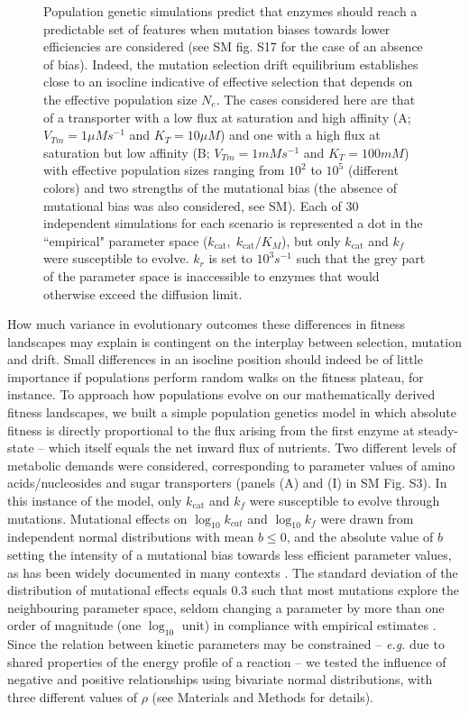 \begin{figure}[h!]
\begin{minipage}[c]{0.46\linewidth}
\end{minipage}
\caption{Population genetic simulations predict that enzymes should reach a predictable set of features when mutation biases towards lower efficiencies are considered (see SM  fig. S17 for the case of an absence of bias). Indeed, the mutation selection drift equilibrium establishes close to an isocline indicative of effective selection that depends on the effective population size $N_e$. The cases considered here are that of a transporter with a low flux at saturation and high affinity (A; $V_{Tm}=1\mu Ms^{-1}$ and $K_T=10\mu M$) and one with a high flux at saturation but low affinity (B; $V_{Tm}=1mMs^{-1}$ and $K_T=100mM$) with effective population sizes ranging from $10^2$ to $10^5$ (different colors) and two strengths of the mutational bias (the absence of mutational bias was also considered, see SM). Each of 30 independent simulations for each scenario is represented a dot in the ``empirical" parameter space ($k_\text{cat}, \;k_\text{cat}/K_M$), but only $k_\text{cat}$ and $k_f$ were susceptible to evolve. $k_r$ is set to $10^3s^{-1}$ such that the grey part of the parameter space is inaccessible to enzymes that would otherwise exceed the diffusion limit. 
}
\label{figure2D_Evolutionary_results}
\end{figure}

How much variance in evolutionary outcomes these differences in fitness landscapes may explain is contingent on the interplay between selection, mutation and drift. Small differences in an isocline position should indeed be of little importance if populations perform random walks on the fitness plateau, for instance. To approach how populations evolve on our mathematically derived fitness landscapes, we built a simple population genetics model in which absolute fitness is directly proportional to the flux arising from the first enzyme at steady-state -- which itself equals the net inward flux of nutrients. Two different levels of metabolic demands were considered, corresponding to parameter values of amino acids/nucleosides and sugar transporters (panels (A) and (I) in SM Fig. S3). In this instance of the model, only $k_\text{cat}$ and $k_f$ were susceptible to evolve through mutations. Mutational effects on $\log_{10}k_{cat}$ and $\log_{10}k_f$ were drawn from independent normal distributions with mean $b \leq 0$, and the absolute value of $b$ setting the intensity of a mutational bias towards less efficient parameter values, as has been widely documented in many contexts \citep{EyreWalker07,Serohijos12,Heckmann18}. The standard deviation of the distribution of mutational effects equals $0.3$ such that most mutations explore the neighbouring parameter space,  seldom changing a parameter by more than one order of magnitude (one $\log_{10}$ unit) in compliance with empirical estimates \citep{Carlin16}. Since the relation between kinetic parameters may be constrained -- \textit{e.g.} due to shared properties of the energy profile of a reaction -- we tested the influence of negative and positive relationships using bivariate normal distributions, with three different values of $\rho$ (see Materials and Methods for details). 

